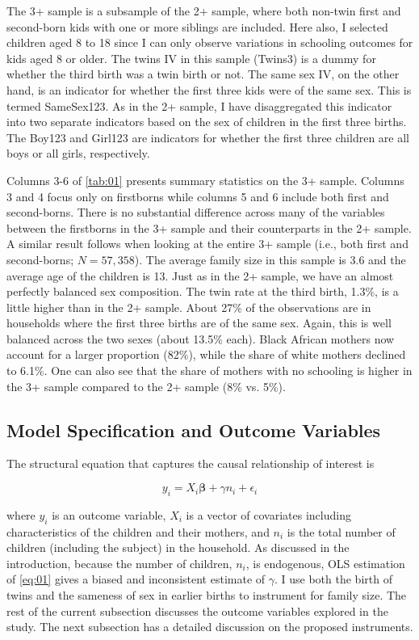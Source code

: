 The 3+ sample is a subsample of the 2+ sample, where both non-twin first and second-born kids with one or more siblings are included. Here also, I selected children aged 8 to 18 since I can only observe variations in schooling outcomes for kids aged 8 or older. The twins IV in this sample (Twins3) is a dummy for whether the third birth was a twin birth or not. The same sex IV, on the other hand, is an indicator for whether the first three kids were of the same sex. This is termed SameSex123. As in the 2+ sample, I have disaggregated this indicator into two separate indicators based on the sex of children in the first three births. The Boy123 and Girl123 are indicators for whether the first three children are all boys or all girls, respectively. 

Columns 3-6 of \autoref{tab:01} presents summary statistics on the 3+ sample. Columns 3 and 4 focus only on firstborns while columns 5 and 6 include both first and second-borns. There is no substantial difference across many of the variables between the firstborns in the 3+ sample and their counterparts in the 2+ sample. A similar result follows when looking at the entire 3+ sample (i.e., both first and second-borns; $ N = 57,358 $). The average family size in this sample is 3.6 and the average age of the children is 13. Just as in the 2+ sample, we have an almost perfectly balanced sex composition. The twin rate at the third birth, 1.3\%, is a little higher than in the 2+ sample. About 27\% of the observations are in households where the first three births are of the same sex. Again, this is well balanced across the two sexes (about 13.5\% each). Black African mothers now account for a larger proportion (82\%), while the share of white mothers declined to 6.1\%. One can also see that the share of mothers with no schooling is higher in the 3+ sample compared to the 2+ sample (8\% vs. 5\%).   
    

\subsection{Model Specification and Outcome Variables}

The structural equation that captures the causal relationship of interest is

\begin{equation}\label{eq:01}
	y_{i} = X_{i}\boldsymbol{\beta} + \gamma n_{i} + \epsilon_{i}
\end{equation}

where $ y_{i} $ is an outcome variable, $ X_{i} $ is a vector of covariates including characteristics of the children and their mothers, and $ n_{i} $ is the total number of children (including the subject) in the household. As discussed in the introduction, because the number of children, $ n_{i} $, is endogenous, OLS estimation of \eqref{eq:01} gives a biased and inconsistent estimate of $ \gamma $. I use both the birth of twins and the sameness of sex in earlier births to instrument for family size. The rest of the current subsection discusses the outcome variables explored in the study. The next subsection has a detailed discussion on the proposed instruments.  

